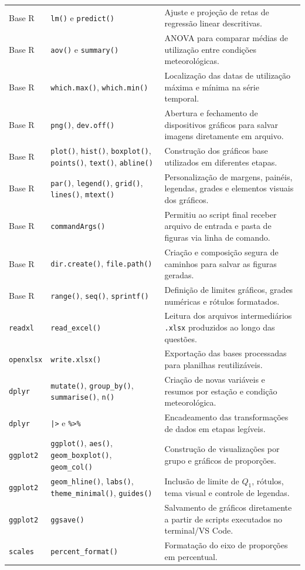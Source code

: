 \documentclass[12pt,oneside,a4paper,english,brazil]{abntex2}
\begin{document}
\begin{longtable}{p{3.2cm}p{4.2cm}p{7.1cm}}
Base R & \texttt{lm()} e \texttt{predict()} & Ajuste e projeção de retas de regressão linear descritivas. \\
Base R & \texttt{aov()} e \texttt{summary()} & ANOVA para comparar médias de utilização entre condições meteorológicas. \\
Base R & \texttt{which.max()}, \texttt{which.min()} & Localização das datas de utilização máxima e mínima na série temporal. \\
Base R & \texttt{png()}, \texttt{dev.off()} & Abertura e fechamento de dispositivos gráficos para salvar imagens diretamente em arquivo. \\
Base R & \texttt{plot()}, \texttt{hist()}, \texttt{boxplot()}, \texttt{points()}, \texttt{text()}, \texttt{abline()} & Construção dos gráficos base utilizados em diferentes etapas. \\
Base R & \texttt{par()}, \texttt{legend()}, \texttt{grid()}, \texttt{lines()}, \texttt{mtext()} & Personalização de margens, painéis, legendas, grades e elementos visuais dos gráficos. \\
Base R & \texttt{commandArgs()} & Permitiu ao script final receber arquivo de entrada e pasta de figuras via linha de comando. \\
Base R & \texttt{dir.create()}, \texttt{file.path()} & Criação e composição segura de caminhos para salvar as figuras geradas. \\
Base R & \texttt{range()}, \texttt{seq()}, \texttt{sprintf()} & Definição de limites gráficos, grades numéricas e rótulos formatados. \\
\texttt{readxl} & \texttt{read\_excel()} & Leitura dos arquivos intermediários \texttt{.xlsx} produzidos ao longo das questões. \\
\texttt{openxlsx} & \texttt{write.xlsx()} & Exportação das bases processadas para planilhas reutilizáveis. \\
\texttt{dplyr} & \texttt{mutate()}, \texttt{group\_by()}, \texttt{summarise()}, \texttt{n()} & Criação de novas variáveis e resumos por estação e condição meteorológica. \\
\texttt{dplyr} & \texttt{|>} e \texttt{\%>\%} & Encadeamento das transformações de dados em etapas legíveis. \\
\texttt{ggplot2} & \texttt{ggplot()}, \texttt{aes()}, \texttt{geom\_boxplot()}, \texttt{geom\_col()} & Construção de visualizações por grupo e gráficos de proporções. \\
\texttt{ggplot2} & \texttt{geom\_hline()}, \texttt{labs()}, \texttt{theme\_minimal()}, \texttt{guides()} & Inclusão de limite de $Q_1$, rótulos, tema visual e controle de legendas. \\
\texttt{ggplot2} & \texttt{ggsave()} & Salvamento de gráficos diretamente a partir de scripts executados no terminal/VS Code. \\
\texttt{scales} & \texttt{percent\_format()} & Formatação do eixo de proporções em percentual. \\
\bottomrule
\end{longtable}
\normalsize
\end{document}
